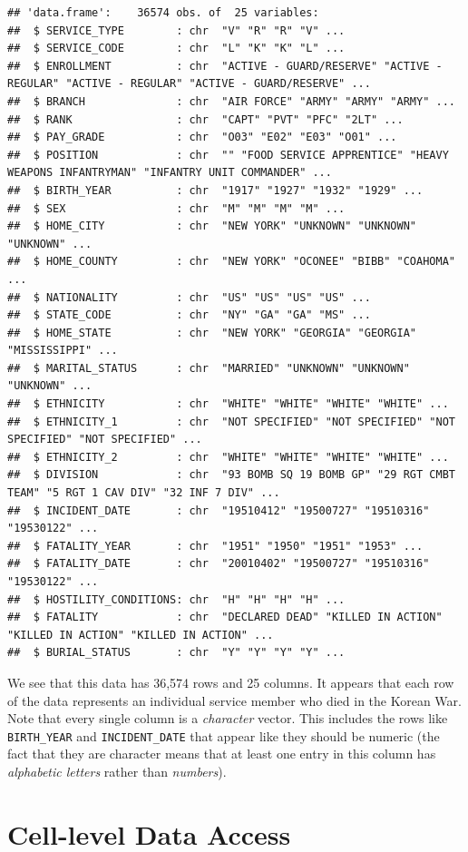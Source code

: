\documentclass[]{book}
\begin{document}
\begin{verbatim}
## 'data.frame':    36574 obs. of  25 variables:
##  $ SERVICE_TYPE        : chr  "V" "R" "R" "V" ...
##  $ SERVICE_CODE        : chr  "L" "K" "K" "L" ...
##  $ ENROLLMENT          : chr  "ACTIVE - GUARD/RESERVE" "ACTIVE - REGULAR" "ACTIVE - REGULAR" "ACTIVE - GUARD/RESERVE" ...
##  $ BRANCH              : chr  "AIR FORCE" "ARMY" "ARMY" "ARMY" ...
##  $ RANK                : chr  "CAPT" "PVT" "PFC" "2LT" ...
##  $ PAY_GRADE           : chr  "O03" "E02" "E03" "O01" ...
##  $ POSITION            : chr  "" "FOOD SERVICE APPRENTICE" "HEAVY WEAPONS INFANTRYMAN" "INFANTRY UNIT COMMANDER" ...
##  $ BIRTH_YEAR          : chr  "1917" "1927" "1932" "1929" ...
##  $ SEX                 : chr  "M" "M" "M" "M" ...
##  $ HOME_CITY           : chr  "NEW YORK" "UNKNOWN" "UNKNOWN" "UNKNOWN" ...
##  $ HOME_COUNTY         : chr  "NEW YORK" "OCONEE" "BIBB" "COAHOMA" ...
##  $ NATIONALITY         : chr  "US" "US" "US" "US" ...
##  $ STATE_CODE          : chr  "NY" "GA" "GA" "MS" ...
##  $ HOME_STATE          : chr  "NEW YORK" "GEORGIA" "GEORGIA" "MISSISSIPPI" ...
##  $ MARITAL_STATUS      : chr  "MARRIED" "UNKNOWN" "UNKNOWN" "UNKNOWN" ...
##  $ ETHNICITY           : chr  "WHITE" "WHITE" "WHITE" "WHITE" ...
##  $ ETHNICITY_1         : chr  "NOT SPECIFIED" "NOT SPECIFIED" "NOT SPECIFIED" "NOT SPECIFIED" ...
##  $ ETHNICITY_2         : chr  "WHITE" "WHITE" "WHITE" "WHITE" ...
##  $ DIVISION            : chr  "93 BOMB SQ 19 BOMB GP" "29 RGT CMBT TEAM" "5 RGT 1 CAV DIV" "32 INF 7 DIV" ...
##  $ INCIDENT_DATE       : chr  "19510412" "19500727" "19510316" "19530122" ...
##  $ FATALITY_YEAR       : chr  "1951" "1950" "1951" "1953" ...
##  $ FATALITY_DATE       : chr  "20010402" "19500727" "19510316" "19530122" ...
##  $ HOSTILITY_CONDITIONS: chr  "H" "H" "H" "H" ...
##  $ FATALITY            : chr  "DECLARED DEAD" "KILLED IN ACTION" "KILLED IN ACTION" "KILLED IN ACTION" ...
##  $ BURIAL_STATUS       : chr  "Y" "Y" "Y" "Y" ...
\end{verbatim}

We see that this data has 36,574 rows and 25 columns. It appears that
each row of the data represents an individual service member who died in
the Korean War. Note that every single column is a \emph{character}
vector. This includes the rows like \texttt{BIRTH\_YEAR} and
\texttt{INCIDENT\_DATE} that appear like they should be numeric (the
fact that they are character means that at least one entry in this
column has \emph{alphabetic letters} rather than \emph{numbers}).

\section{Cell-level Data Access}\label{cell-level-data-access}
\end{document}
